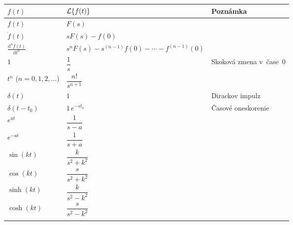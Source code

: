 \documentclass[a4paper, 10pt, ]{article}
\begin{document}
\noindent
\begin{longtable}[l]{p{3.7cm} @{} p{5.9cm} p{2.8cm}}

    \toprule
    $f(t)$                                  & $\mathcal{L}{\left\{f(t)\right\}}$   & {\color{Gray} \scriptsize Poznámka} \\
    \midrule
    \addlinespace[5mm]
    \endhead



    $f(t)$                                  & $F(s)$                                \\[4mm]
    $\dot f(t)$                             & $sF(s) - f(0)$                        \\[4mm]
    $\displaystyle \frac{\text{d}^n f(t)}{\text{d}t^n}$                                 & $s^nF(s) - s^{(n-1)} f(0) - \cdots - f^{(n-1)}(0)$ \\[4mm]    
    \midrule \addlinespace[4mm]


    $1$                                     & $\dfrac{1}{s}$                        & {\color{Gray} \scriptsize Skoková zmena v~čase~$0$}  \\[4mm]
    $t^n$ ($n=0,1,2,\dots$)                 & $\dfrac{n!}{s^{n+1}}$                 \\[4mm]
    \midrule \addlinespace[4mm]


    $\delta(t)$                             & $1$                                   & {\color{Gray} \scriptsize Dirackov impulz} \\[4mm]
    $\delta(t-t_0)$                         & $1 \, e^{-st_0}$                      & {\color{Gray} \scriptsize Časové oneskorenie} \\[4mm]
    \midrule \addlinespace[4mm]
        
    
    $e^{at}$                                & $\dfrac{1}{s-a}$                      \\[4mm]
    $e^{-at}$                                & $\dfrac{1}{s+a}$                     \\[4mm]
    \midrule \addlinespace[4mm]


    $\sin(kt)$                               & $\dfrac{k}{s^2+k^2}$                  \\[4mm]
    $\cos(kt)$                               & $\dfrac{s}{s^2+k^2}$                  \\[4mm]
    $\sinh(kt)$                              & $\dfrac{k}{s^2-k^2}$                  \\[4mm]
    $\cosh(kt)$                              & $\dfrac{s}{s^2-k^2}$                  \\[4mm]
    \midrule \addlinespace[4mm]



\end{longtable}
\end{document}
